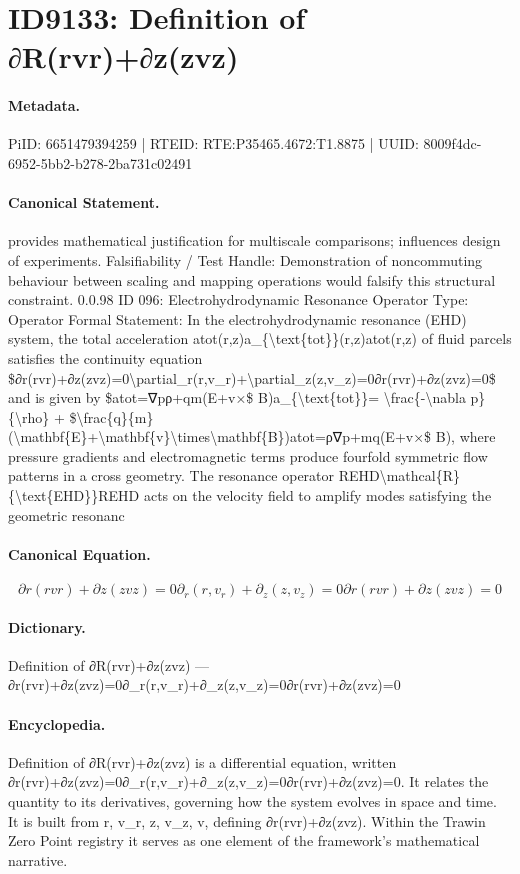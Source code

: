 \section*{ID9133: Definition of ∂R(rvr)+∂z(zvz)}
\paragraph{Metadata.}
PiID: 6651479394259 | RTEID: RTE:P35465.4672:T1.8875 | UUID: 8009f4dc-6952-5bb2-b278-2ba731c02491

\paragraph{Canonical Statement.}
provides mathematical justification for multiscale comparisons; influences design of experiments. Falsifiability / Test Handle: Demonstration of noncommuting behaviour between scaling and mapping operations would falsify this structural constraint. 0.0.98 ID 096: Electrohydrodynamic Resonance Operator Type: Operator Formal Statement: In the electrohydrodynamic resonance (EHD) system, the total acceleration atot(r,z)a\_\{\textbackslash{}text\{tot\}\}(r,z)atot(r,z) of fluid parcels satisfies the continuity equation \$∂r(rvr)+∂z(zvz)=0\textbackslash{}partial\_r(r,v\_r)+\textbackslash{}partial\_z(z,v\_z)=0∂r(rvr)+∂z(zvz)=0\$ and is given by \$atot=∇pρ+qm(E+v×\$ B)a\_\{\textbackslash{}text\{tot\}\}= \textbackslash{}frac\{-\textbackslash{}nabla p\}\{\textbackslash{}rho\} + \$\textbackslash{}frac\{q\}\{m\}(\textbackslash{}mathbf\{E\}+\textbackslash{}mathbf\{v\}\textbackslash{}times\textbackslash{}mathbf\{B\})atot=ρ∇p+mq(E+v×\$ B), where pressure gradients and electromagnetic terms produce fourfold symmetric flow patterns in a cross geometry. The resonance operator REHD\textbackslash{}mathcal\{R\} \{\textbackslash{}text\{EHD\}\}REHD acts on the velocity field to amplify modes satisfying the geometric resonanc

\paragraph{Canonical Equation.}
\[
∂r(rvr)+∂z(zvz)=0\partial_r(r,v_r)+\partial_z(z,v_z)=0∂r(rvr)+∂z(zvz)=0
\]

\paragraph{Dictionary.}
Definition of ∂R(rvr)+∂z(zvz) — ∂r(rvr)+∂z(zvz)=0∂\_r(r,v\_r)+∂\_z(z,v\_z)=0∂r(rvr)+∂z(zvz)=0

\paragraph{Encyclopedia.}
Definition of ∂R(rvr)+∂z(zvz) is a differential equation, written ∂r(rvr)+∂z(zvz)=0∂\_r(r,v\_r)+∂\_z(z,v\_z)=0∂r(rvr)+∂z(zvz)=0. It relates the quantity to its derivatives, governing how the system evolves in space and time. It is built from r, v\_r, z, v\_z, v, defining ∂r(rvr)+∂z(zvz). Within the Trawin Zero Point registry it serves as one element of the framework's mathematical narrative.
